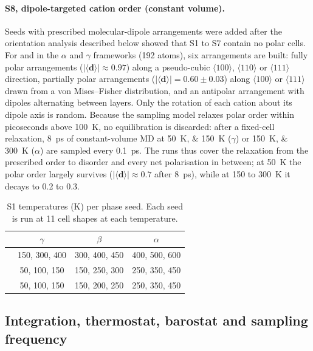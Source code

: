 \paragraph{S8, dipole-targeted cation order (constant volume).} Seeds with prescribed molecular-dipole
arrangements were added after the orientation analysis described below showed that S1 to S7 contain
no polar cells. For \MASnI{} and \FASnI{} in the $\alpha$ and $\gamma$ frameworks (192 atoms), six
arrangements are built: fully polar arrangements ($|\langle\mathbf{d}\rangle|\approx0.97$) along a
pseudo-cubic $\langle100\rangle$, $\langle110\rangle$ or $\langle111\rangle$ direction, partially
polar arrangements ($|\langle\mathbf{d}\rangle|=0.60\pm0.03$) along $\langle100\rangle$ or
$\langle111\rangle$ drawn from a von Mises--Fisher distribution, and an antipolar arrangement with
dipoles alternating between layers. Only the rotation of each cation about its dipole axis is random.
Because the sampling model relaxes polar order within picoseconds above \SI{100}{\kelvin}, no
equilibration is discarded: after a fixed-cell relaxation, \SI{8}{\pico\second} of constant-volume MD
at \SIlist{50;150}{\kelvin} ($\gamma$) or \SIlist{150;300}{\kelvin} ($\alpha$) are sampled every
\SI{0.1}{\pico\second}. The runs thus cover the relaxation from the prescribed order to disorder and
every net polarisation in between; at \SI{50}{\kelvin} the polar order largely survives
($|\langle\mathbf{d}\rangle|\approx0.7$ after \SI{8}{\pico\second}), while at 150 to
\SI{300}{\kelvin} it decays to 0.2 to 0.3.

\begin{table}[tb]
\caption{S1 temperatures (K) per phase seed. Each seed is run at 11 cell shapes at each
temperature.}
\label{tab:tgrid}
\begin{tabular}{lccc}
\toprule
 & $\gamma$ & $\beta$ & $\alpha$ \\
\midrule
\CsSnI{} & 150, 300, 400 & 300, 400, 450 & 400, 500, 600 \\
\MASnI{} & 50, 100, 150  & 150, 250, 300 & 250, 350, 450 \\
\FASnI{} & 50, 100, 150  & 150, 200, 250 & 250, 350, 450 \\
\bottomrule
\end{tabular}
\end{table}

\subsection{Integration, thermostat, barostat and sampling frequency}
\label{sec:configgen:md}

